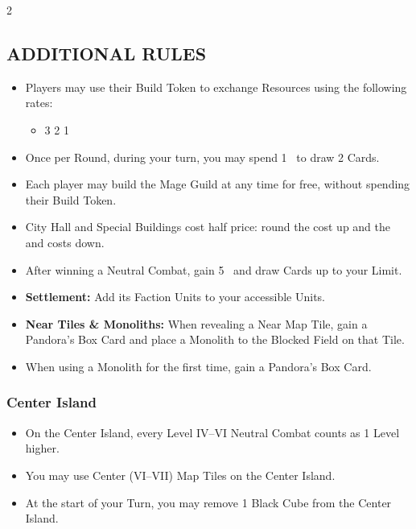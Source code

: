 \begin{multicols*}{2}
\subsection*{\MakeUppercase{Additional Rules}}
\begin{itemize}
  \item Players may use their Build Token to exchange Resources using the following rates:
  \begin{itemize}
    \item 3   2   1 
  \end{itemize}
  \item Once per Round, during your turn, you may spend 1~ to draw 2 Cards.
  \item Each player may build the Mage Guild at any time for free, without spending their Build Token.
  \item City Hall and Special Buildings cost half price: round the  cost up and the  and  costs down.
  \item After winning a Neutral Combat, gain 5~ and draw Cards up to your  Limit.
  \item \textbf{Settlement:} Add its Faction Units to your accessible Units.
  \item \textbf{Near Tiles \& Monoliths:} When revealing a Near Map Tile, gain a Pandora's Box Card and place a Monolith to the Blocked Field on that Tile.
  \item When using a Monolith for the first time, gain a Pandora's Box Card.
\end{itemize}

\subsubsection*{Center Island}
\begin{itemize}
  \item On the Center Island, every Level IV--VI Neutral Combat counts as 1 Level higher.
  \item You may use Center (VI--VII) Map Tiles on the Center Island.
  \item At the start of your Turn, you may remove 1 Black Cube from the Center Island.
\end{itemize}


\end{multicols*}

